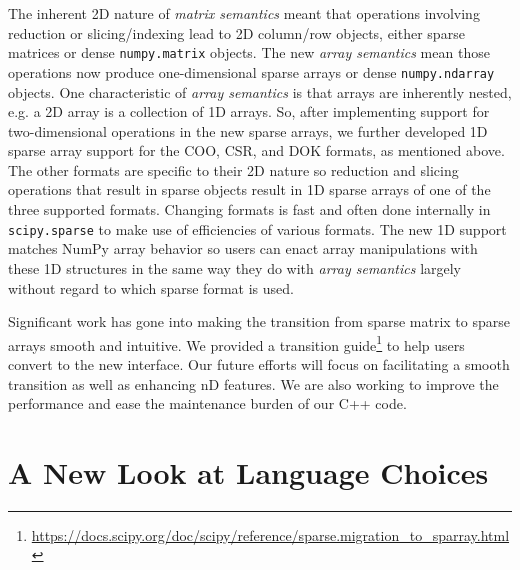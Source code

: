\documentclass[acmsmall]{acmart}
\begin{document}
The inherent 2D nature of \emph{matrix semantics} meant that operations involving
reduction or slicing/indexing lead to 2D column/row objects, either sparse matrices
or dense \texttt{numpy.matrix} objects. The new \emph{array semantics} mean those operations
now produce one-dimensional sparse arrays or dense \texttt{numpy.ndarray} objects.
One characteristic of \emph{array semantics} is that arrays are inherently nested,
e.g. a 2D array is a collection of 1D arrays.
So, after implementing support for two-dimensional operations in the new sparse arrays, we
further developed 1D sparse array support for the COO, CSR, and DOK formats, as mentioned above.
The other formats are specific to their 2D nature so reduction and slicing
operations that result in sparse objects result in 1D sparse
arrays of one of the three supported formats. Changing formats is fast and often done
internally in \texttt{scipy.sparse} to make use of efficiencies of various formats.
The new 1D support matches NumPy array behavior so users can enact array
manipulations with these 1D structures in the same way they do with \emph{array
semantics} largely without regard to which sparse format is used.

Significant work has gone into making the transition from sparse matrix to
sparse arrays smooth and intuitive. We provided a transition
guide\footnote{\url{https://docs.scipy.org/doc/scipy/reference/sparse.migration_to_sparray.html}}
to help users convert to the new interface.
Our future efforts will focus on facilitating a smooth transition as well as enhancing
nD features. We are also working to improve the performance
and ease the maintenance burden of our C++ code.

\section{A New Look at Language Choices}\label{sec:languages}
\end{document}
